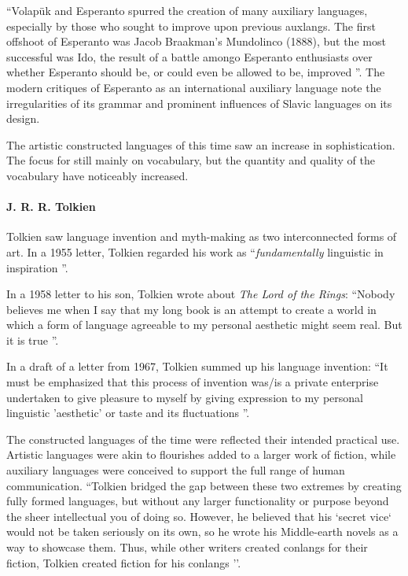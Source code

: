 \documentclass[14pt, a4paper]{extreport}
\begin{document}
``Volapük and Esperanto spurred the creation of many auxiliary languages, especially by those who sought to improve upon previous auxlangs. The first offshoot of Esperanto was Jacob Braakman's Mundolinco (1888), but the most successful was Ido, the result of a battle amongo Esperanto enthusiasts over whether Esperanto should be, or could even be allowed to be, improved \parencite{sanders}''. The modern critiques of Esperanto as an international auxiliary language note the irregularities of its grammar and prominent influences of Slavic languages on its design.

The artistic constructed languages of this time saw an increase in sophistication. The focus for still mainly on vocabulary, but the quantity and quality of the vocabulary have noticeably increased.
        \paragraph{J. R. R. Tolkien}
Tolkien saw language invention and myth-making as two interconnected forms of art. In a 1955 letter, Tolkien regarded his work as ``\textit{fundamentally} linguistic in inspiration \parencite[233]{letters}''.

In a 1958 letter to his son, Tolkien wrote about \textit{The Lord of the Rings}: ``Nobody believes me when I say that my long book is an attempt to create a world in which a form of language agreeable to my personal aesthetic might seem real. But it is true \parencite[285]{letters}''.

In a draft of a letter from 1967, Tolkien summed up his language invention: ``It must be emphasized that this process of invention was/is a private enterprise undertaken to give pleasure to myself by giving expression to my personal linguistic 'aesthetic' or taste and its fluctuations \parencite[411]{letters}''.

The constructed languages of the time were reflected their intended practical use. Artistic languages were akin to flourishes added to a larger work of fiction, while auxiliary languages were conceived to support the full range of human communication. ``Tolkien bridged the gap between these two extremes by creating fully formed languages, but without any larger functionality or purpose beyond the sheer intellectual you of doing so. However, he believed that his `secret vice` would not be taken seriously on its own, so he wrote his Middle-earth novels as a way to showcase them. Thus, while other writers created conlangs for their fiction, Tolkien created fiction for his conlangs \parencite{sanders}''.
\end{document}
